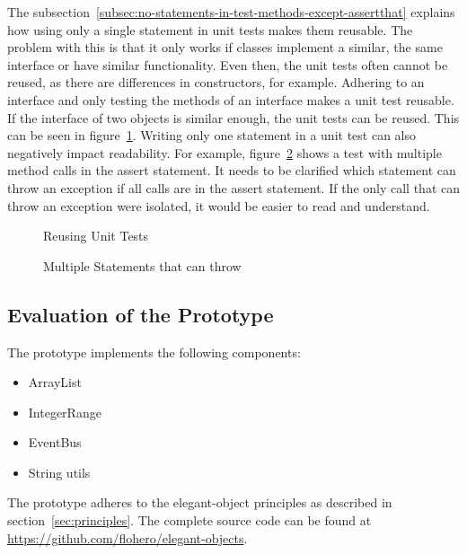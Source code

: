 The subsection\ \ref{subsec:no-statements-in-test-methods-except-assertthat} explains how using only a single statement in unit tests makes them reusable.
The problem with this is that it only works if classes implement a similar, the same interface or have similar functionality.
Even then, the unit tests often cannot be reused, as there are differences in constructors, for example.
Adhering to an interface and only testing the methods of an interface makes a unit test reusable.
If the interface of two objects is similar enough, the unit tests can be reused.
This can be seen in figure\ \ref{fig:reused-unit-tests}.
Writing only one statement in a unit test can also negatively impact readability.
For example, figure\ \ref{fig:multiple-statements-can-throw} shows a test with multiple method calls in the assert statement.
It needs to be clarified which statement can throw an exception if all calls are in the assert statement.
If the only call that can throw an exception were isolated, it would be easier to read and understand.

\begin{figure}[h]
    \caption{Reusing Unit Tests}
    
    
    \label{fig:reused-unit-tests}
\end{figure}

\begin{figure}[h]
    \caption{Multiple Statements that can throw}
    
    \label{fig:multiple-statements-can-throw}
\end{figure}

\subsection{Evaluation of the Prototype}\label{subsec:evaluation-of-the-prototype}
The prototype implements the following components:
\begin{itemize}
    \item ArrayList
    \item IntegerRange
    \item EventBus
    \item String utils
\end{itemize}
The prototype adheres to the elegant-object principles as described in section\ \ref{sec:principles}.
The complete source code can be found at \url{https://github.com/flohero/elegant-objects}.

